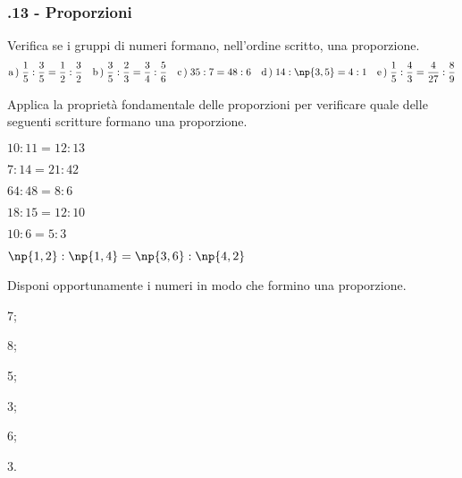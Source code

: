 \subsubsection*{\thechapter.13 - Proporzioni}

\begin{esercizio}
 \label{ese:3.118}
Verifica se i gruppi di numeri formano, nell'ordine scritto, una proporzione.
\[
\text{a}\,\text{)}\;\frac{1}{5}:\frac{3}{5}=\frac{1}{2}:\frac{3}{2}\quad
\text{b}\,\text{)}\;\frac{3}{5}:\frac{2}{3}=\frac{3}{4}:\frac{5}{6}\quad
\text{c}\,\text{)}\;35:7=48:6\quad
\text{d}\,\text{)}\;14:\np{3,5}=4:1\quad
\text{e}\,\text{)}\;\frac{1}{5}:\frac{4}{3}=\frac{4}{27}:\frac{8}{9}
\]
\end{esercizio}
\pagebreak
\begin{esercizio}
 \label{ese:3.119}
 Applica la proprietà fondamentale delle proporzioni per verificare quale delle seguenti
scritture formano una proporzione.
\begin{multicols}{2}
 \TabPositions{4cm}
 \begin{enumeratea}
 \item $10:11=12:13$ \tab\quad\boxSi\quad\boxNo
 \item $7:14=21:42$ \tab\quad\boxSi\quad\boxNo
 \item $64:48=8:6$ \tab\quad\boxSi\quad\boxNo
 \item $18:15=12:10$ \tab\quad\boxSi\quad\boxNo
 \item $10:6=5:3$ \tab\quad\boxSi\quad\boxNo
 \item $\np{1,2}:\np{1,4}=\np{3,6}:\np{4,2}$ \tab\quad\boxSi\quad\boxNo
 \end{enumeratea}
 \end{multicols}
\end{esercizio}

\begin{esercizio}
 \label{ese:3.120}
Disponi opportunamente i numeri in modo che formino una proporzione.
\begin{multicols}{2}
\begin{enumeratea}
\item 7;
\item 8;
\item 5;
\item 3;
\item 6;
\item 3.
\end{enumeratea}
 \end{multicols}
\end{esercizio}

